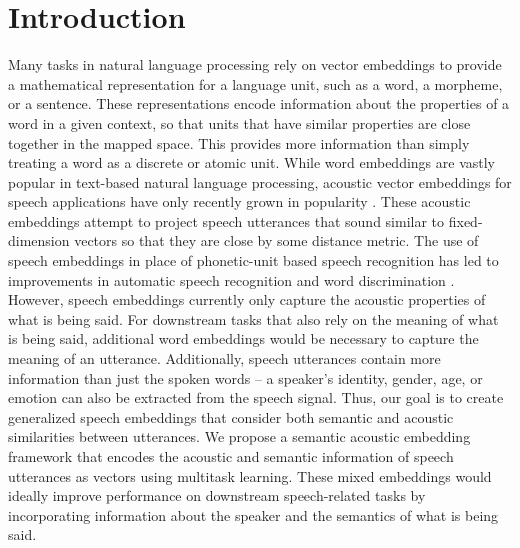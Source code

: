 \documentclass{article}
\begin{document}
\section{Introduction}
Many tasks in natural language processing rely on vector embeddings to provide a mathematical representation for a language unit, such as a word, a morpheme, or a sentence. These representations encode information about the properties of a word in a given context, so that units that have similar properties are close together in the mapped space. This provides more information than simply treating a word as a discrete or atomic unit. While word embeddings are vastly popular in text-based natural language processing, acoustic vector embeddings for speech applications have only recently grown in popularity \citep{bengio2014word,kamper2016deep,ghannay2016evaluation}. These acoustic embeddings attempt to project speech utterances that sound similar to fixed-dimension vectors so that they are close by some distance metric. The use of speech embeddings in place of phonetic-unit based speech recognition has led to improvements in automatic speech recognition \citep{bengio2014word} and word discrimination \citep{kamper2016deep}.  However, speech embeddings currently only capture the acoustic properties of what is being said.  For downstream tasks that also rely on the meaning of what is being said, additional word embeddings would be necessary to capture the meaning of an utterance.  Additionally, speech utterances contain more information than just the spoken words -- a speaker's identity, gender, age, or emotion can also be extracted from the speech signal.  Thus, our goal is to create generalized speech embeddings that consider both semantic and acoustic similarities between utterances. We propose a semantic acoustic embedding framework that encodes the acoustic and semantic information of speech utterances as vectors using multitask learning. These mixed embeddings would ideally improve performance on downstream speech-related tasks \citep{audhkhasi2016semantic} by incorporating information about the speaker and the semantics of what is being said.
\end{document}
